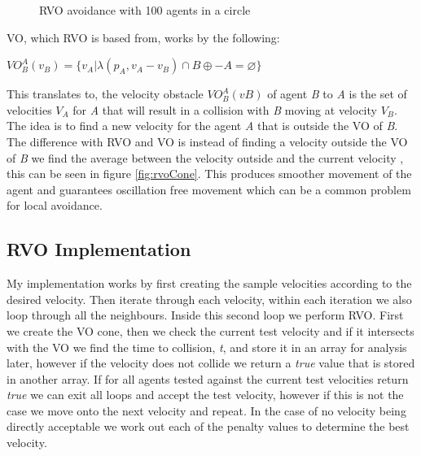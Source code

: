 \documentclass[a4paper,twocolumn]{article}
\begin{document}
\begin{center}
\begin{figure}[t]
\caption{RVO avoidance with 100 agents in a circle}
\label{fig:RVOcircle}
\end{figure}
\end{center}


VO, which RVO is based from, works by the following:\\
\begin{center}
$VO^{A}_{B} (v_{B} ) = \{v_{A} | λ(p_{A} , v_{A} − v_{B} ) \cap B \oplus − A = \varnothing \}$
\end{center}

This translates to, the velocity obstacle $VO^{A}_{B} (v B )$ of agent \emph{B} to \emph{A} is the set of velocities $V_{A}$ for \emph{A} that will result in a collision with \emph{B} moving at velocity $V_{B}$. The idea is to find a new velocity for the agent \emph{A} that is outside the VO of \emph{B}. The difference with RVO and VO is instead of finding a velocity outside the VO of \emph{B} we find the average between the velocity outside and the current velocity \cite{JBerg2008RVO}\cite{AGuy2009CP}, this can be seen in figure \ref{fig:rvoCone}. This produces smoother movement of the agent and guarantees oscillation free movement which can be a common problem for local avoidance.\\

\subsection{RVO Implementation}
My implementation works by first creating the sample velocities according to the desired velocity. Then iterate through each velocity, within each iteration we also loop through all the neighbours. Inside this second loop we perform RVO. First we create the VO cone, then we check the current test velocity and if it intersects with the VO we find the time to collision, \emph{t}, and store it in an array for analysis later, however if the velocity does not collide we return a \emph{true} value that is stored in another array. If for all agents tested against the current test velocities return \emph{true} we can exit all loops and accept the test velocity, however if this is not the case we move onto the next velocity and repeat. In the case of no velocity being directly acceptable we work out each of the penalty values to determine the best velocity\cite{DCherry2013RVO}\cite{JBerg2008CS}.\\
\end{document}
